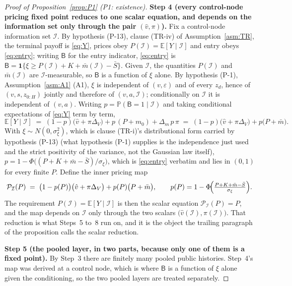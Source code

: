 \documentclass[11pt]{article}
\newcommand{\Eop}{\mathbb{E}}
\newcommand{\Prb}{\mathbb{P}}
\newcommand{\ind}{\mathbf{1}}
\begin{document}
\begin{proof}[Proof of Proposition~\ref{prop:P1} (P1: existence)]
\smallskip
\noindent\textbf{Step 4 (every control-node pricing fixed point reduces to one scalar equation, and
depends on the information set only through the pair $(\hat v,\pi)$).}
Fix a control-node information set $\mathcal I$. By hypothesis (P-13), clause (TR-iv) of
Assumption~\ref{asm:TR}, the terminal payoff is \eqref{eq:Y}, prices obey $P(\mathcal I) =
\Eop[Y \mid \mathcal I]$ and entry obeys \eqref{eq:entry}; writing $\mathsf B$ for the entry
indicator, \eqref{eq:entry} is $\mathsf B = \ind\{\xi \ge P(\mathcal I)+K+\bar m(\mathcal I)-\bar
S\}$. Given $\mathcal I$, the quantities $P(\mathcal I)$ and $\bar m(\mathcal I)$ are
$\mathcal I$-measurable, so $\mathsf B$ is a function of $\xi$ alone. By hypothesis (P-1),
Assumption~\ref{asm:A1} (A1), $\xi$ is independent of $(v,\varepsilon)$ and of every $z_d$, hence of
$(v,s,z_{0:H})$ jointly and therefore of $(v,a,\mathcal I)$; conditionally on $\mathcal I$ it is
independent of $(v,a)$. Writing $p = \Prb(\mathsf B = 1 \mid \mathcal I)$ and taking conditional
expectations of \eqref{eq:Y} term by term,
\begin{equation}
\label{eq:P1-EY}
\Eop[Y \mid \mathcal I]
\;=\; (1-p)\bigl(\hat v + \pi\Delta_V\bigr) + p\,(P+m_0) + \Delta_m\,p\,\pi
\;=\; (1-p)\bigl(\hat v + \pi\Delta_V\bigr) + p\bigl(P + \bar m\bigr).
\end{equation}
With $\xi \sim N(0,\sigma_\xi^2)$, which is clause (TR-i)'s distributional form carried by hypothesis
(P-13) (what hypothesis (P-1) supplies is the independence just used and the strict positivity of the
variance, not the Gaussian law itself), $p = 1-\Phi\bigl((P+K+\bar m-\bar S)/\sigma_\xi\bigr)$, which
is \eqref{eq:entry} verbatim and lies in $(0,1)$ for every finite $P$. Define the inner pricing map
\begin{equation}
\label{eq:P1-inner}
\mathcal P_{\mathcal I}(P) \;=\; \bigl(1-p(P)\bigr)\bigl(\hat v + \pi\Delta_V\bigr)
+ p(P)\bigl(P+\bar m\bigr),
\qquad
p(P) = 1-\Phi\!\Bigl(\tfrac{P+K+\bar m-\bar S}{\sigma_\xi}\Bigr).
\end{equation}
The requirement $P(\mathcal I) = \Eop[Y \mid \mathcal I]$ is then the scalar equation
$\mathcal P_{\mathcal I}(P) = P$, and the map depends on $\mathcal I$ only through the two scalars
$\bigl(\hat v(\mathcal I),\pi(\mathcal I)\bigr)$. That reduction is what Steps~5 to~8 run on, and it
is the object the trailing paragraph of the proposition calls the scalar reduction.

\smallskip
\noindent\textbf{Step 5 (the pooled layer, in two parts, because only one of them is a fixed point).}
By Step~3 there are finitely many pooled public histories. Step~4's map was derived at a control
node, which is where $\mathsf B$ is a function of $\xi$ alone given the conditioning, so the two
pooled layers are treated separately.


\end{proof}
\end{document}
